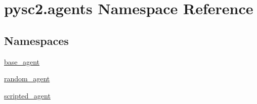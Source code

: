 \hypertarget{namespacepysc2_1_1agents}{}\section{pysc2.\+agents Namespace Reference}
\label{namespacepysc2_1_1agents}
\subsection*{Namespaces}
\begin{DoxyCompactItemize}
\item 
 \mbox{\hyperlink{namespacepysc2_1_1agents_1_1base__agent}{base\+\_\+agent}}
\item 
 \mbox{\hyperlink{namespacepysc2_1_1agents_1_1random__agent}{random\+\_\+agent}}
\item 
 \mbox{\hyperlink{namespacepysc2_1_1agents_1_1scripted__agent}{scripted\+\_\+agent}}
\end{DoxyCompactItemize}
